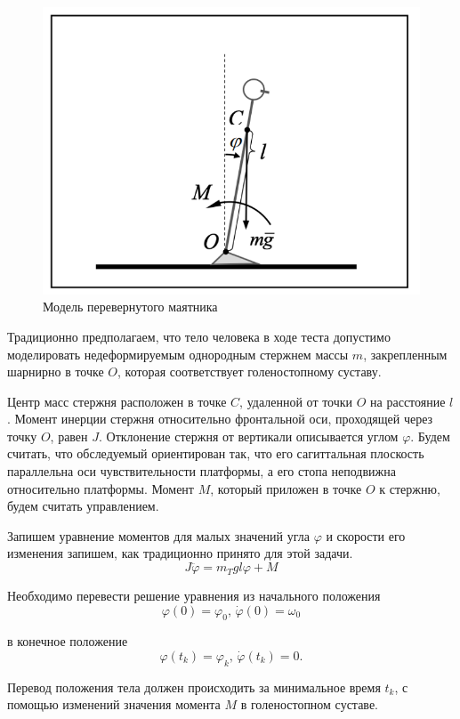 \documentclass[a4paper,14pt]{article}
\theoremstyle{plain} %
\theoremstyle{definition} %
\theoremstyle{remark} %
\begin{document}
{\begin{figure}[h!]
    \centering
    \includegraphics[width=1.00\linewidth]{pendulum.png}
    \caption{Модель перевернутого маятника}
    \label{fig:pendulum}
\end{figure}

Традиционно предполагаем, что тело человека в ходе теста допустимо
моделировать недеформируемым однородным стержнем массы $m$,
закрепленным шарнирно в точке $O$, которая соответствует
голеностопному суставу.

Центр масс стержня расположен в точке $C$, удаленной от точки $O$
на расстояние $l$. Момент инерции стержня относительно фронтальной
оси, проходящей через точку $O$, равен $J$. Отклонение стержня от
вертикали описывается углом $\varphi$. Будем считать, что обследуемый
ориентирован так, что его сагиттальная плоскость параллельна оси
чувствительности платформы, а его стопа неподвижна относительно
платформы. Момент $M$, который приложен в точке $O$ к стержню,
будем считать управлением.

Запишем уравнение моментов для малых значений угла $\varphi$ и
скорости его изменения запишем, как традиционно принято для этой задачи.
\[
    J\ddot{\varphi}= m_Tgl\varphi+M
\]

Необходимо перевести решение уравнения из начального положения
\[
    \varphi(0)=\varphi_0, \,\dot{\varphi}(0)=\omega_0
\]

в конечное положение
\[
    \varphi(t_k)=\varphi_k,\, \dot{\varphi}(t_k)=0.
\]

Перевод положения тела должен происходить за минимальное
время $t_k$, с помощью изменений значения момента $M$ в
голеностопном суставе.

}
\end{document}
